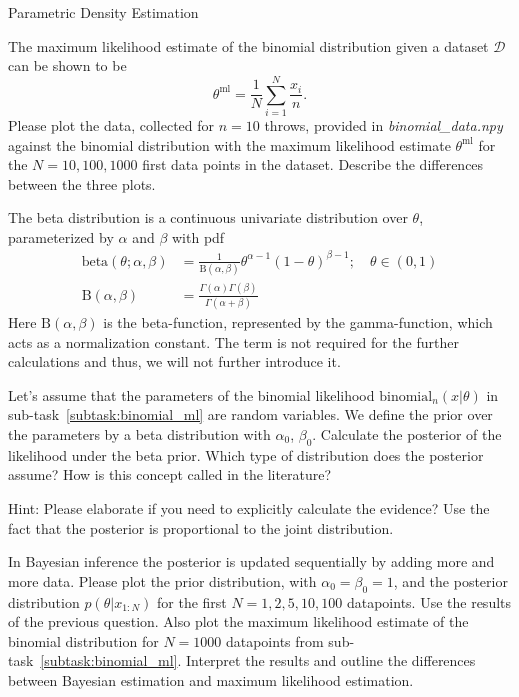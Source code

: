 \documentclass[
	ngerman,
	points=true,%
    solution=true,
    accentcolor=9c,
    colorbacktitle
	]{tudaexercise}
\begin{document}
\begin{task}{Parametric Density Estimation}
\begin{subtask}
        The maximum likelihood estimate of the binomial distribution given a dataset $\mathcal{D}$ can be shown to be
        $$\theta^{\mathrm{ml}} = \frac{1}{N} \sum_{i=1}^{N} \frac{x_i}{n}.$$
        Please plot the data, collected for $n=10$ throws, provided in \textit{binomial\_data.npy} against the binomial distribution with the maximum likelihood estimate $\theta^{\mathrm{ml}}$ for the $N=10, 100, 1000$ first data points in the dataset. Describe the differences between the three plots.
    \end{subtask}
    \begin{solution}
        
    \end{solution}
    \begin{subtask}
        The beta distribution is a continuous univariate distribution over $\theta$, parameterized by $\alpha$ and $\beta$ with pdf
        \begin{align*}
            \mathrm{beta}(\theta;\alpha, \beta) &= \frac{1}{\mathrm{B}(\alpha, \beta)} \theta^{\alpha - 1}(1-\theta)^{\beta - 1}; \quad \theta\in(0,1)\\
            \mathrm{B}(\alpha, \beta) &= \frac{\Gamma(\alpha)\Gamma(\beta)}{\Gamma(\alpha +  \beta)}
        \end{align*}
        Here $\mathrm{B}(\alpha, \beta)$ is the beta-function, represented by the gamma-function, which acts as a normalization constant. The term is not required for the further calculations and thus, we will not further introduce it.

        Let's assume that the parameters of the binomial likelihood $\mathrm{binomial}_n(x|\theta)$ in sub-task~\ref{subtask:binomial_ml} are random variables. We define the prior over the parameters by a beta distribution with $\alpha_0$, $\beta_0$. Calculate the posterior of the likelihood under the beta prior. Which type of distribution does the posterior assume? How is this concept called in the literature?

        Hint: Please elaborate if you need to explicitly calculate the evidence? Use the fact that the posterior is proportional to the joint distribution.
        \end{subtask}
        \begin{solution}
            
        \end{solution}
        \begin{subtask}
            In Bayesian inference the posterior is updated sequentially by adding more and more data. Please plot the prior distribution, with $\alpha_0 = \beta_0 = 1$, and the posterior distribution $p(\theta|x_{1:N})$ for the first $N=1,2,5,10,100$ datapoints. Use the results of the previous question. Also plot the maximum likelihood estimate of the binomial distribution for $N=1000$ datapoints from sub-task~\ref{subtask:binomial_ml}. Interpret the results and outline the differences between Bayesian estimation and maximum likelihood estimation.
        \end{subtask}
    \begin{solution}
        

\end{solution}
\end{task}
\end{document}
